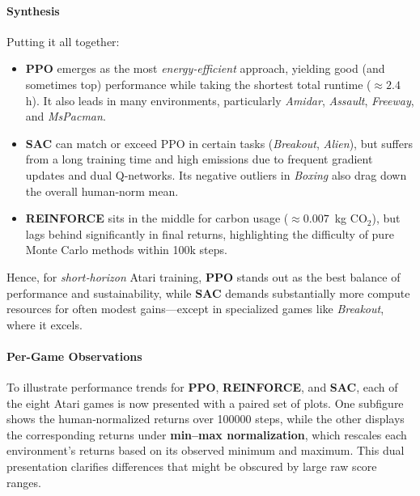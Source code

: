 \paragraph{Synthesis}
Putting it all together:
\begin{itemize}
	\item \textbf{PPO} emerges as the most \emph{energy‐efficient} approach, yielding good (and sometimes top) performance while taking the shortest total runtime (\(\approx2.4\)h). It also leads in many environments, particularly \emph{Amidar}, \emph{Assault}, \emph{Freeway}, and \emph{MsPacman}.
	\item \textbf{SAC} can match or exceed PPO in certain tasks (\emph{Breakout}, \emph{Alien}), but suffers from a long training time and high emissions due to frequent gradient updates and dual Q‐networks. Its negative outliers in \emph{Boxing} also drag down the overall human‐norm mean.
	\item \textbf{REINFORCE} sits in the middle for carbon usage (\(\approx0.007\)~kg CO$_2$), but lags behind significantly in final returns, highlighting the difficulty of pure Monte Carlo methods within 100k steps.
\end{itemize}
Hence, for \emph{short‐horizon} Atari training, \textbf{PPO} stands out as the best balance of performance and sustainability, while \textbf{SAC} demands substantially more compute resources for often modest gains—except in specialized games like \emph{Breakout}, where it excels. 



\paragraph{Per-Game Observations}
To illustrate performance trends for \textbf{PPO}, \textbf{REINFORCE}, and \textbf{SAC}, each of the eight Atari games is now presented with a paired set of plots. One subfigure shows the human‐normalized returns over \num{100000} steps, while the other displays the corresponding returns under \textbf{min--max normalization}, which rescales each environment’s returns based on its observed minimum and maximum. This dual presentation clarifies differences that might be obscured by large raw score ranges.

